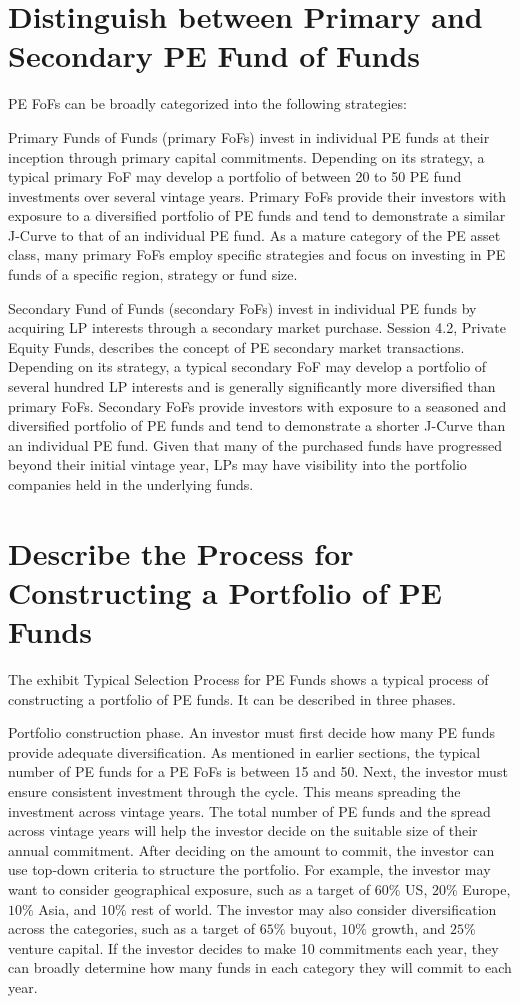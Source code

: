 \documentclass[11pt]{article}
\begin{document}
\section*{Distinguish between Primary and Secondary PE Fund of Funds}
PE FoFs can be broadly categorized into the following strategies:

Primary Funds of Funds (primary FoFs) invest in individual PE funds at their inception through primary capital commitments. Depending on its strategy, a typical primary FoF may develop a portfolio of between 20 to 50 PE fund investments over several vintage years. Primary FoFs provide their investors with exposure to a diversified portfolio of PE funds and tend to demonstrate a similar J-Curve to that of an individual PE fund. As a mature category of the PE asset class, many primary FoFs employ specific strategies and focus on investing in PE funds of a specific region, strategy or fund size.

Secondary Fund of Funds (secondary FoFs) invest in individual PE funds by acquiring LP interests through a secondary market purchase. Session 4.2, Private Equity Funds, describes the concept of PE secondary market transactions. Depending on its strategy, a typical secondary FoF may develop a portfolio of several hundred LP interests and is generally significantly more diversified than primary FoFs. Secondary FoFs provide investors with exposure to a seasoned and diversified portfolio of PE funds and tend to demonstrate a shorter J-Curve than an individual PE fund. Given that many of the purchased funds have progressed beyond their initial vintage year, LPs may have visibility into the portfolio companies held in the underlying funds.

\section*{Describe the Process for Constructing a Portfolio of PE Funds}
The exhibit Typical Selection Process for PE Funds shows a typical process of constructing a portfolio of PE funds. It can be described in three phases.

Portfolio construction phase. An investor must first decide how many PE funds provide adequate diversification. As mentioned in earlier sections, the typical number of PE funds for a PE FoFs is between 15 and 50. Next, the investor must ensure consistent investment through the cycle. This means spreading the investment across vintage years. The total number of PE funds and the spread across vintage years will help the investor decide on the suitable size of their annual commitment. After deciding on the amount to commit, the investor can use top-down criteria to structure the portfolio. For example, the investor may want to consider geographical exposure, such as a target of $60 \%$ US, $20 \%$ Europe, $10 \%$ Asia, and $10 \%$ rest of world. The investor may also consider diversification across the categories, such as a target of $65 \%$ buyout, $10 \%$ growth, and $25 \%$ venture capital. If the investor decides to make 10 commitments each year, they can broadly determine how many funds in each category they will commit to each year.
\end{document}
